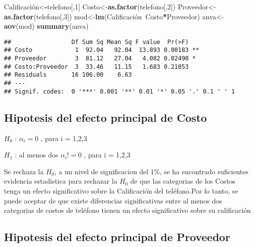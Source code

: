 \documentclass[]{article}
\newenvironment{Shaded}{\begin{snugshade}}{\end{snugshade}}
\newcommand{\DecValTok}[1]{\textcolor[rgb]{0.00,0.00,0.81}{#1}}
\newcommand{\KeywordTok}[1]{\textcolor[rgb]{0.13,0.29,0.53}{\textbf{#1}}}
\newcommand{\NormalTok}[1]{#1}
\newcommand{\OperatorTok}[1]{\textcolor[rgb]{0.81,0.36,0.00}{\textbf{#1}}}
\begin{document}
\begin{Shaded}
\begin{Highlighting}[]
\NormalTok{Calificación<}\OperatorTok{-}\NormalTok{telefono[,}\DecValTok{1}\NormalTok{]}
\NormalTok{Costo<-}\KeywordTok{as.factor}\NormalTok{(telefono[,}\DecValTok{2}\NormalTok{])}
\NormalTok{Proveedor<-}\KeywordTok{as.factor}\NormalTok{(telefono[,}\DecValTok{3}\NormalTok{])}
\NormalTok{mod<-}\KeywordTok{lm}\NormalTok{(Calificación~Costo}\OperatorTok{*}\NormalTok{Proveedor)}
\NormalTok{anva<-}\KeywordTok{aov}\NormalTok{(mod)}
\KeywordTok{summary}\NormalTok{(anva)}
\end{Highlighting}
\end{Shaded}

\begin{verbatim}
##                 Df Sum Sq Mean Sq F value  Pr(>F)   
## Costo            1  92.04   92.04  13.893 0.00183 **
## Proveedor        3  81.12   27.04   4.082 0.02490 * 
## Costo:Proveedor  3  33.46   11.15   1.683 0.21053   
## Residuals       16 106.00    6.63                   
## ---
## Signif. codes:  0 '***' 0.001 '**' 0.01 '*' 0.05 '.' 0.1 ' ' 1
\end{verbatim}

\hypertarget{hipotesis-del-efecto-principal-de-costo}{%
\subsection{Hipotesis del efecto principal de
Costo}\label{hipotesis-del-efecto-principal-de-costo}}

\(H_0\) : \(\alpha_i = 0\) , para i = 1,2,3

\(H_1\) : al menos dos \(\alpha_i != 0\) , para i = 1,2,3

Se rechaza la \(H_0\), a un nivel de significacion del 1\%, se ha
encontrado suficientes evidencia estadistica para rechazar la \(H_0\) de
que las categorias de los Costos tenga un efecto significativo sobre la
Calificación del teléfono.Por lo tanto, se puede aceptar de que existe
diferencias significativas entre al menos dos categorias de costos de
teléfono tienen un efecto significativo sobre su calificación

\hypertarget{hipotesis-del-efecto-principal-de-proveedor}{%
\subsection{Hipotesis del efecto principal de
Proveedor}\label{hipotesis-del-efecto-principal-de-proveedor}}
\end{document}
